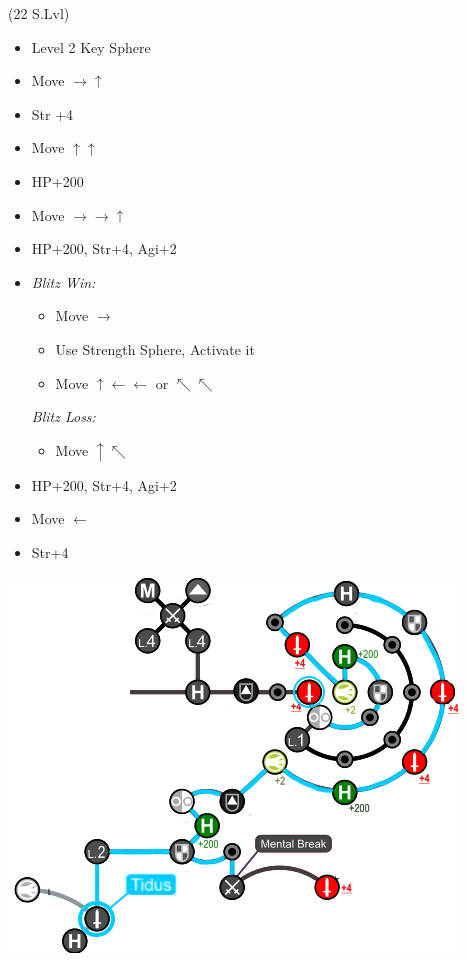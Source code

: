 \begin{spheregrid}
  \begin{itemize}
    \tidusf (22 S.Lvl)
    \begin{itemize}
      \item Level 2 Key Sphere
      \item Move $\rightarrow\uparrow$
      \item Str +4
      \item Move $\uparrow\uparrow$
      \item HP+200
      \item Move $\rightarrow\rightarrow\uparrow$
      \item HP+200, Str+4, Agi+2
      \item \textit{Blitz Win:}
      \begin{itemize}
      \item Move $\rightarrow$
      \item Use Strength Sphere, Activate it
      \item Move $\uparrow\leftarrow\leftarrow$ or $\nwarrow\nwarrow$
      \end{itemize}
      \textit{Blitz Loss:}
      \begin{itemize}
      \item Move $\uparrow\nwarrow$
      \end{itemize}
      \item HP+200, Str+4, Agi+2
      \item Move $\leftarrow$
      \item Str+4
    \end{itemize}
    \includegraphics[width=.8\columnwidth]{graphics/Tidus_post_crawler}
  \end{itemize}
\end{spheregrid}
